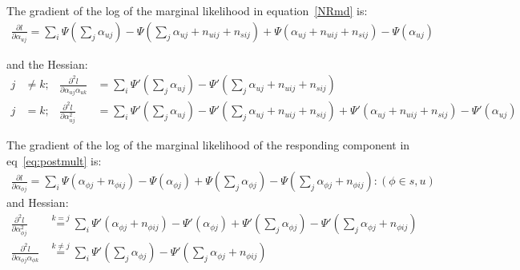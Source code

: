 \documentclass[11pt]{article}
\begin{document}
The gradient of the log of the marginal likelihood in equation~\eqref{NRmd} is:
\begin{align}
\frac{\partial l}{ \partial \alpha_{uj}} = \sum_i \Psi(\sum_j \alpha_{uj}) - \Psi (\sum_j \alpha_{uj}+n_{uij}+n_{sij}) + \Psi(\alpha_{uj}+n_{uij}+n_{sij}) - \Psi(\alpha_{uj})\label{mdgrad}
\end{align}

and the Hessian:
\begin{align}
j&\ne k; &\frac{\partial^2 l}{\partial \alpha_{uj}\alpha_{uk}} & = \sum_i \Psi'(\sum_j\alpha_{uj})-\Psi'(\sum_j\alpha_{uj}+n_{uij}+n_{sij})\\
j&=k;&\frac{\partial^2l}{\partial \alpha_{uj}^2} &= \sum_i \Psi'(\sum_j\alpha_{uj})-\Psi'(\sum_j\alpha_{uj}+n_{uij}+n_{sij})+\Psi'(\alpha_{uj}+n_{uij}+n_{sij})-\Psi'(\alpha_{uj})
\end{align}

The gradient of the log of the marginal likelihood of the responding component in eq~\ref{eq:postmult} is:
\begin{align}
\frac{\partial l}{\partial\alpha_{\phi j}} = \sum_i \Psi(\alpha_{\phi j}+n_{\phi ij})-\Psi(\alpha_{\phi j})+\Psi(\sum_j \alpha_{\phi j}) - \Psi(\sum_j \alpha_{\phi j}+n_{\phi ij}): (\phi \in {s,u})
\end{align}
and Hessian:
\begin{align}
\frac{\partial^2l}{\partial \alpha_{\phi j}^2}& \overset {k=j}{=}\sum_i \Psi'(\alpha_{\phi j}+n_{\phi ij}) - \Psi'(\alpha_{\phi j}) + \Psi'(\sum_j \alpha_{\phi j}) - \Psi'(\sum_j\alpha_{\phi j}+n_{\phi ij})\\
\frac{\partial^2l}{\partial \alpha_{\phi j}\alpha_{\phi k}}&\overset{k\ne j}{=}\sum_i\Psi'(\sum_j \alpha_{\phi j}) - \Psi'(\sum_j\alpha_{\phi j}+n_{\phi ij})
\end{align}
\end{document}

